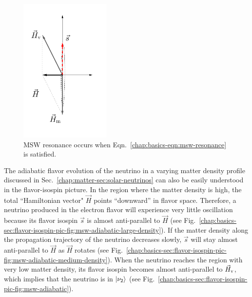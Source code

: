 \begin{figure}[h!t]
    \centering
    \includegraphics[width=0.4\textwidth]{chapters/assets/basics/matter-effect-critical-density}
    \caption{MSW resonance occurs when Eqn.~\eqref{chap:basics-eqn:msw-resonance} is satisfied.}
    \label{chap:basics-sec:flavor-isospin-pic-fig:msw-adiabatic-critical}
\end{figure}


The adiabatic flavor evolution of the neutrino in a varying matter density profile discussed in Sec.~\ref{chap:matter-sec:solar-neutrinos} can also be easily understood in the flavor-isospin picture.
In the region where the matter density is high, the total ``Hamiltonian vector" $\vec H$ points ``downward'' in flavor space. Therefore, a neutrino produced in the electron flavor will experience very little oscillation because its flavor isospin $\vec s$ is almost anti-parallel to $\vec H$ (see Fig.~\ref{chap:basics-sec:flavor-isospin-pic-fig:msw-adiabatic-large-density}). If the matter density along the propagation trajectory of the neutrino decreases slowly, $\vec s$ will stay almost anti-parallel to $\vec H$ as $\vec H$ rotates (see Fig.~\ref{chap:basics-sec:flavor-isospin-pic-fig:msw-adiabatic-medium-density}).
When the neutrino reaches the region with very low matter density, its flavor isospin becomes almost anti-parallel to $\vec H_{\mathrm v}$, which implies that the neutrino is in $\left| \nu_2\right\rangle$ (see Fig.~\ref{chap:basics-sec:flavor-isospin-pic-fig:msw-adiabatic}).




